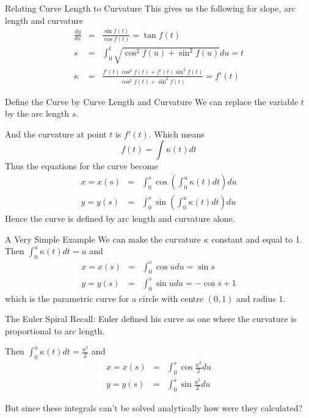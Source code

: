 \documentclass{beamer}
\begin{document}
\begin{frame}{Relating Curve Length to Curvature}
	This gives us the following for slope, arc length and curvature
	\begin{eqnarray*}
	\frac{dy}{dx} &=& \frac{\sin f(t)}{\cos f(t)} = \tan f(t) \\
 	s &=& \int_0^t \sqrt{\cos^2 f(u) + \sin^2 f(u)} du = t \\
 	\kappa &=& \frac{f'(t) \cos^2 f(t) + f'(t) \sin^2 f(t)}{\cos^2 f(t) + \sin^2 f(t)} = f'(t)
 \end{eqnarray*}
\end{frame}

\begin{frame}{Define the Curve by Curve Length and Curvature}
	We can replace the variable $t$ by the arc length $s$.
	 
	And the curvature at point $t$ is $f'(t)$. Which means
	 \[
	 f(t) = \int \kappa(t) dt
	 \]
	Thus the equations for the curve become
	\begin{eqnarray*}
	x = x(s) &=& \int_{0}^{s} \cos \left( \int_0^u \kappa(t) dt \right) du \\
	y = y(s) &=& \int_{0}^{s} \sin \left( \int_0^u \kappa(t) dt \right) du
	\end{eqnarray*}
	Hence the curve is defined by arc length and curvature alone.
\end{frame}

\begin{frame}{A Very Simple Example}
	We can make the curvature $\kappa$ constant and equal to 1. Then 
	$ \int_0^u \kappa(t) dt = u $ and
	\begin{eqnarray*}
		x = x(s) &=& \int_{0}^{s} \cos u du = \sin s\\
		y = y(s) &=& \int_{0}^{s} \sin u du = - \cos s + 1
	\end{eqnarray*}
	which is the parametric curve for a circle with centre $(0, 1)$ and radius $1$.
	
\end{frame}


\begin{frame}{The Euler Spiral}
	Recall: Euler defined his curve as one where the curvature is proportional to arc length.
	
	\begin{center}
	\end{center}
	Then 
	$ \int_0^u \kappa(t) dt = \frac{u^2}{2} $ and
	\begin{eqnarray*}
		x = x(s) &=& \int_{0}^{s} \cos \frac{u^2}{2} du\\
		y = y(s) &=& \int_{0}^{s} \sin \frac{u^2}{2} du
	\end{eqnarray*}

	But since these integrals can't be solved analytically how were they calculated?
\end{frame}
\end{document}
